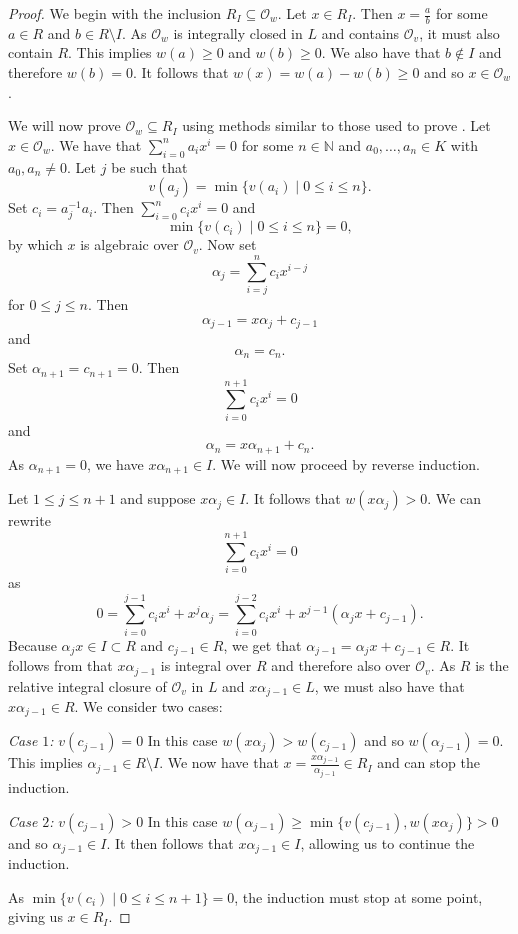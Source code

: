 \documentclass[12pt,a4paper]{amsart}
\theoremstyle{definition}
\begin{document}
\begin{proof}
We begin with the inclusion $R_I\subseteq \mathcal{O}_w$.
Let $x\in R_I$. Then $x=\frac{a}{b}$ for some $a\in R$ and $b\in R\setminus I$.
As $\mathcal{O}_w$ is integrally closed in $L$ and contains $\mathcal{O}_v$, it must also contain $R$.
This implies $w(a)\geq0$ and $w(b)\geq0$.
We also have that $b\notin I$ and therefore $w(b)=0$.
It follows that $w(x)=w(a)-w(b)\geq0$ and so $x\in \mathcal{O}_w$.

We will now prove $\mathcal{O}_w\subseteq R_I$ using methods similar to those used to prove .
Let $x\in \mathcal{O}_w$.
We have that $\sum_{i=0}^na_ix^i=0$ for some $n\in\mathds{N}$ and $a_0,\ldots,a_n\in K$ with $a_0,a_n\neq0$.
Let $j$ be such that $$v(a_j)=\min\{v(a_i)\mid0\leq i\leq n\}.$$ Set $c_i=a_j^{-1}a_i$.
Then $\sum_{i=0}^nc_ix^i=0$ and $$\min\{v(c_i)\mid0\leq i\leq n\}=0,$$ by which $x$ is algebraic over $\mathcal{O}_v$.
Now set $$\alpha_j=\sum_{i=j}^{n}c_ix^{i-j}$$
for $0\leq j\leq n$. Then $$\alpha_{j-1}=x\alpha_j+c_{j-1}$$ and $$\alpha_{n}=c_{n}.$$
Set $\alpha_{n+1}=c_{n+1}=0$. Then $$\sum_{i=0}^{n+1}c_ix^i=0$$ and $$\alpha_{n}=x\alpha_{n+1}+c_{n}.$$
As $\alpha_{n+1}=0$, we have $x\alpha_{n+1}\in I$.
We will now proceed by reverse induction.

Let $1\leq j\leq n+1$ and suppose $x\alpha_j\in I$.
It follows that $w(x\alpha_j)>0$.
We can rewrite $$\sum_{i=0}^{n+1}c_ix^i=0$$
as
$$0=\sum_{i=0}^{j-1}c_ix^i+x^j\alpha_j=\sum_{i=0}^{j-2}c_ix^i+x^{j-1}(\alpha_jx+c_{j-1}).$$
Because $\alpha_jx\in I\subset R$ and $c_{j-1}\in R$, we get that $\alpha_{j-1}=\alpha_jx+c_{j-1}\in R$.
It follows from  that $x\alpha_{j-1}$ is integral over $R$ and therefore also over $\mathcal{O}_v$.
As $R$ is the relative integral closure of $\mathcal{O}_v$ in $L$ and $x\alpha_{j-1}\in L$, we must also have that $x\alpha_{j-1}\in R$.
We consider two cases:\par
\textit{Case $1$:} $v(c_{j-1})=0$\newline
In this case $w(x\alpha_j)>w(c_{j-1})$ and so $w(\alpha_{j-1})=0$.
This implies $\alpha_{j-1}\in R\setminus I$.
We now have that $x=\frac{x\alpha_{j-1}}{\alpha_{j-1}}\in R_I$ and can stop the induction.\par
\textit{Case $2$:} $v(c_{j-1})>0$\newline
In this case $w(\alpha_{j-1})\geq\min\{v(c_{j-1}),w(x\alpha_j)\}>0$ and so $\alpha_{j-1}\in I$.
It then follows that $x\alpha_{j-1}\in I$, allowing us to continue the induction.\par

As $\min\{v(c_i)\mid0\leq i\leq n+1\}=0$, the induction must stop at some point, giving us $x\in R_I$.
\end{proof}
\end{document}
